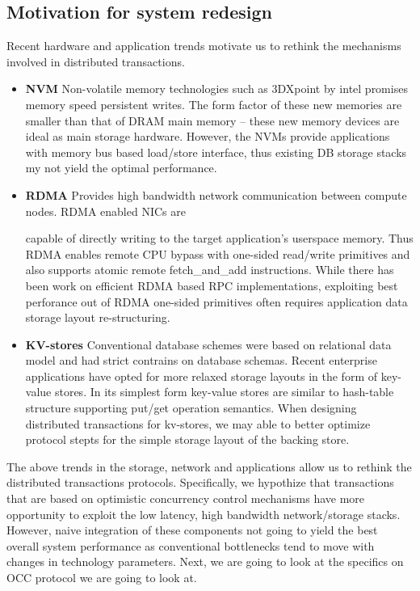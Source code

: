 \subsection{Motivation for system redesign}
Recent hardware and application trends motivate us to rethink the mechanisms involved in
distributed transactions.
\begin{itemize}

\item{\bf NVM}
Non-volatile memory technologies such as 3DXpoint by intel promises memory speed persistent
writes. The form factor of these new memories are smaller than that of DRAM main memory -- these 
new memory devices are ideal as main storage hardware. However, the NVMs provide applications with
memory bus based load/store interface, thus existing DB storage stacks my not yield the optimal performance.
\item{\bf RDMA} Provides high bandwidth network communication between compute nodes. RDMA enabled NICs are

	capable of directly writing to the target application's userspace memory. Thus RDMA enables remote
	CPU bypass with one-sided read/write primitives and also supports atomic remote fetch\_and\_add instructions.
	While there has been work on efficient RDMA based RPC implementations, exploiting best perforance out of 
	RDMA one-sided primitives often requires application data storage layout re-structuring.
\item{\bf KV-stores}
Conventional database schemes were based on relational data model and had strict contrains on database schemas.
Recent enterprise applications have opted for more relaxed storage layouts in the form of key-value stores.
In its simplest form key-value stores are similar to hash-table structure supporting put/get operation semantics.
When designing distributed transactions for kv-stores, we may able to better optimize protocol stepts for the 
simple storage layout of the backing store.

\end{itemize}

The above trends in the storage, network and applications allow us to rethink the distributed 
transactions protocols. Specifically, we hypothize that transactions that are based on optimistic
concurrency control mechanisms have more opportunity to exploit the low latency, high bandwidth
network/storage stacks. However, naive integration of these components not going to yield the 
best overall system performance as conventional bottlenecks tend to move with changes in 
technology parameters. Next, we are going to look at the specifics on OCC protocol we are going to 
look at.


